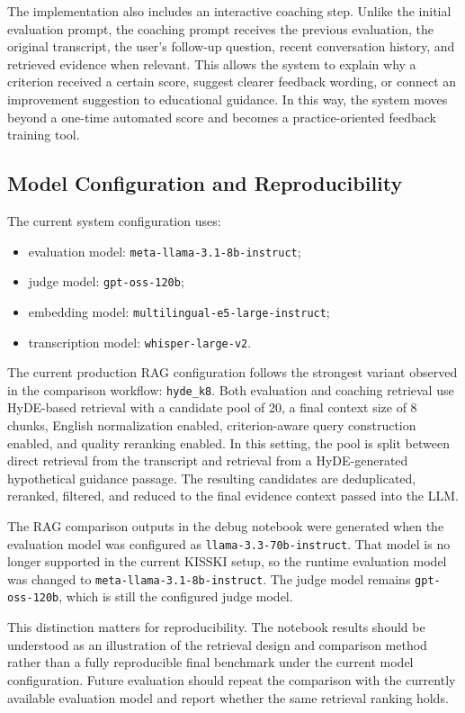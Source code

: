 The implementation also includes an interactive coaching step. Unlike the
initial evaluation prompt, the coaching prompt receives the previous evaluation,
the original transcript, the user's follow-up question, recent conversation
history, and retrieved evidence when relevant. This allows the system to explain
why a criterion received a certain score, suggest clearer feedback wording, or
connect an improvement suggestion to educational guidance. In this way, the
system moves beyond a one-time automated score and becomes a practice-oriented
feedback training tool.

\subsection{Model Configuration and Reproducibility}
The current system configuration uses:
\begin{itemize}
    \item evaluation model: \texttt{meta-llama-3.1-\allowbreak 8b-instruct};
    \item judge model: \texttt{gpt-oss-120b};
    \item embedding model: \texttt{multilingual-e5-large-instruct};
    \item transcription model: \texttt{whisper-large-v2}.
\end{itemize}

The current production RAG configuration follows the strongest variant observed
in the comparison workflow: \texttt{hyde\_k8}. Both evaluation and coaching
retrieval use HyDE-based retrieval with a candidate pool of 20, a final context
size of 8 chunks, English normalization enabled, criterion-aware query
construction enabled, and quality reranking enabled. In this setting, the pool
is split between direct retrieval from the transcript and retrieval from a
HyDE-generated hypothetical guidance passage. The resulting candidates are
deduplicated, reranked, filtered, and reduced to the final evidence context
passed into the LLM.

The RAG comparison outputs in the debug notebook were generated when the
evaluation model was configured as \texttt{llama-3.3-70b-instruct}. That model
is no longer supported in the current KISSKI setup, so the runtime evaluation
model was changed to \texttt{meta-llama-3.1-\allowbreak 8b-instruct}. The judge model
remains \texttt{gpt-oss-120b}, which is still the configured judge model.

This distinction matters for reproducibility. The notebook results should be
understood as an illustration of the retrieval design and comparison method
rather than a fully reproducible final benchmark under the current model
configuration. Future evaluation should repeat the comparison with the currently
available evaluation model and report whether the same retrieval ranking holds.

